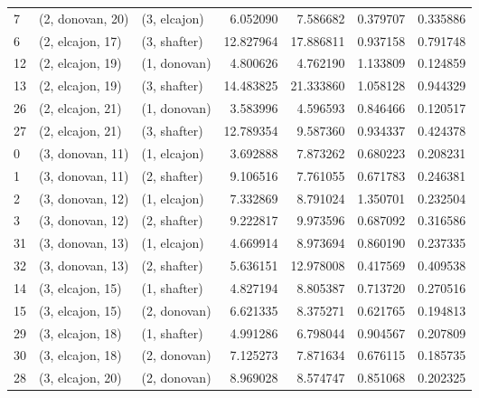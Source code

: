 \begin{tabular}{lllrrrr}
7  &  (2, donovan, 20) &     (3, elcajon) &   6.052090 &   7.586682 &   0.379707 &  0.335886 \\
6  &  (2, elcajon, 17) &     (3, shafter) &  12.827964 &  17.886811 &   0.937158 &  0.791748 \\
12 &  (2, elcajon, 19) &     (1, donovan) &   4.800626 &   4.762190 &   1.133809 &  0.124859 \\
13 &  (2, elcajon, 19) &     (3, shafter) &  14.483825 &  21.333860 &   1.058128 &  0.944329 \\
26 &  (2, elcajon, 21) &     (1, donovan) &   3.583996 &   4.596593 &   0.846466 &  0.120517 \\
27 &  (2, elcajon, 21) &     (3, shafter) &  12.789354 &   9.587360 &   0.934337 &  0.424378 \\
0  &  (3, donovan, 11) &     (1, elcajon) &   3.692888 &   7.873262 &   0.680223 &  0.208231 \\
1  &  (3, donovan, 11) &     (2, shafter) &   9.106516 &   7.761055 &   0.671783 &  0.246381 \\
2  &  (3, donovan, 12) &     (1, elcajon) &   7.332869 &   8.791024 &   1.350701 &  0.232504 \\
3  &  (3, donovan, 12) &     (2, shafter) &   9.222817 &   9.973596 &   0.687092 &  0.316586 \\
31 &  (3, donovan, 13) &     (1, elcajon) &   4.669914 &   8.973694 &   0.860190 &  0.237335 \\
32 &  (3, donovan, 13) &     (2, shafter) &   5.636151 &  12.978008 &   0.417569 &  0.409538 \\
14 &  (3, elcajon, 15) &     (1, shafter) &   4.827194 &   8.805387 &   0.713720 &  0.270516 \\
15 &  (3, elcajon, 15) &     (2, donovan) &   6.621335 &   8.375271 &   0.621765 &  0.194813 \\
29 &  (3, elcajon, 18) &     (1, shafter) &   4.991286 &   6.798044 &   0.904567 &  0.207809 \\
30 &  (3, elcajon, 18) &     (2, donovan) &   7.125273 &   7.871634 &   0.676115 &  0.185735 \\
28 &  (3, elcajon, 20) &     (2, donovan) &   8.969028 &   8.574747 &   0.851068 &  0.202325 \\
\bottomrule
\end{tabular}
